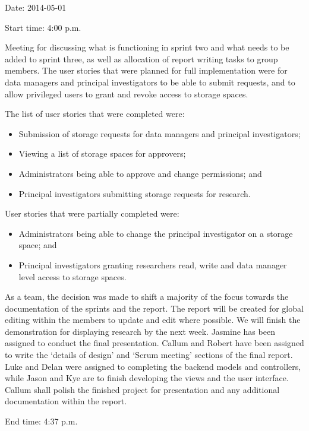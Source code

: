 \documentclass[a4paper,titlepage,12pt]{article}
\begin{document}
Date: 2014-05-01

Start time: 4:00 p.m.

Meeting for discussing what is functioning in sprint two and what needs to be
added to sprint three, as well as allocation of report writing tasks to group
members. The user stories that were planned for full implementation were for
data managers and principal investigators to be able to submit requests, and to
allow privileged users to grant and revoke access to storage spaces.

The list of user stories that were completed were:

\begin{itemize}
	\item Submission of storage requests for data managers and principal
	      investigators;
	\item Viewing a list of storage spaces for approvers;
	\item Administrators being able to approve and change permissions; and
	\item Principal investigators submitting storage requests for research.
\end{itemize}

User stories that were partially completed were:

\begin{itemize}
	\item Administrators being able to change the principal investigator on
	      a storage space; and
	\item Principal investigators granting researchers read, write and data
	      manager level access to storage spaces.
\end{itemize}

As a team, the decision was made to shift a majority of the focus towards the
documentation of the sprints and the report. The report will be created for
global editing within the members to update and edit where possible. We will
finish the demonstration for displaying research by the next week. Jasmine
has been assigned to conduct the final presentation. Callum and Robert have
been assigned to write the `details of design' and `Scrum meeting' sections of
the final report. Luke and Delan were assigned to completing the backend models
and controllers, while Jason and Kye are to finish developing the views and the
user interface. Callum shall polish the finished project for presentation and
any additional documentation within the report.

End time: 4:37 p.m.
\end{document}
